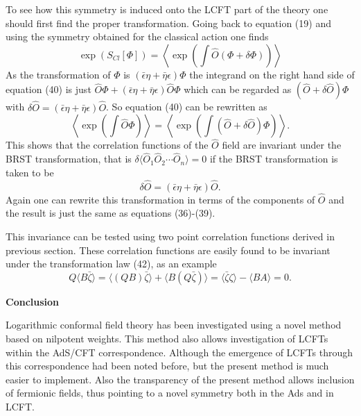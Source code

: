 \documentclass[a4paper,11pt]{article}
\begin{document}
To see how this symmetry is induced onto the LCFT part of the
theory one should first find the proper transformation. Going back
to equation (19) and using the symmetry obtained for the classical
action one finds
\begin{equation}
\exp(S_{Cl}[\Phi])=
\left\langle\exp \left(\int\hat{O}(\Phi+ \delta\Phi)\right)
\right\rangle
\end{equation}
As the transformation of $\Phi$ is $(\bar{\epsilon}\eta +
\bar{\eta}\epsilon)\Phi$ the integrand on the right hand side of
equation (40) is just $\hat{O}\Phi+(\bar{\epsilon}\eta +
\bar{\eta}\epsilon)\hat{O}\Phi$ which can be regarded as
$(\hat{O}+\delta\hat{O})\Phi$ with
$\delta\hat{O}=(\bar{\epsilon}\eta + \bar{\eta}\epsilon)\hat{O}$.
So equation (40) can be rewritten as
\begin{equation}
\left\langle\exp\left(\int\hat{O}\Phi\right)\right\rangle=
\left\langle\exp\left(\int(\hat{O}+\delta\hat{O})
\Phi\right)\right\rangle.
\end{equation}
This shows that the correlation functions of the $\hat{O}$ field
are invariant under the BRST transformation, that is
$\delta\langle \hat{O}_1\hat{O}_2\cdots\hat{O}_n\rangle=0$ if the
BRST transformation is taken to be
\begin{equation}
\delta \hat{O}=(\bar{\epsilon}\eta + \bar{\eta}\epsilon)\hat{O}.
\end{equation}
Again one can rewrite this transformation in terms of the
components of $\hat{O}$ and the result is just the same as
equations (36)-(39).

This invariance can be tested using two point correlation
functions derived in previous section. These correlation functions
are easily found to be invariant under the transformation law
(42), as an example
\begin{equation}\label{example}
Q \langle B \bar{\zeta}\rangle= \langle (Q B) \bar{\zeta}\rangle+
\langle B (Q \bar{\zeta}) \rangle= \langle\bar{\zeta}\zeta\rangle
- \langle BA\rangle=0.
\end{equation}

{\bf \Large Conclusion}

Logarithmic conformal field theory has been investigated using a
novel method based on nilpotent weights. This method also allows
investigation of LCFTs within the AdS/CFT correspondence. Although
the emergence of LCFTs through this correspondence had been noted
before, but the present method is much easier to implement. Also
the transparency of the present method allows inclusion of
fermionic fields, thus pointing to a novel symmetry both in the
Ads and in LCFT.
\end{document}
